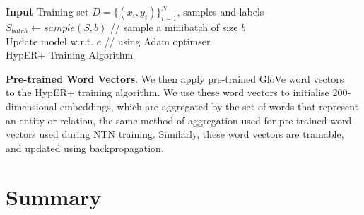 \begin{algorithm}[H]
	\SetAlgoLined
	\textbf{Input} 
	Training set \begin{math} D = \{(x_i, y_i)\}_{i=1}^N \end{math}, samples and labels\;
  	\begin{math} S_{batch} \gets sample(S, b) \end{math} // sample a minibatch of size \begin{math} b \end{math} \\
	Update model w.r.t. \begin{math}  e \end{math} // using Adam optimser \\
	\caption{HypER+ Training Algorithm}
\end{algorithm} \bigskip
 \bigskip
 
\textbf{Pre-trained Word Vectors}. We then apply pre-trained GloVe word vectors ~\citep{pennington2014glove} to the HypER+ training algorithm. We use these word vectors to initialise  200-dimensional embeddings, which are aggregated by the set of words that represent an entity or relation, the same method of aggregation used for pre-trained word vectors used during NTN training. Similarly, these word vectors are trainable, and updated using backpropagation.  



\section{Summary}

